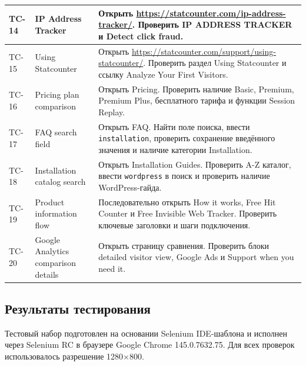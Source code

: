 \documentclass[12pt,a4paper]{report}
\begin{document}
\begin{longtable}{|p{1.5cm}|p{3.9cm}|p{8.8cm}|}
\hline
TC-14 & IP Address Tracker & Открыть \url{https://statcounter.com/ip-address-tracker/}. Проверить IP ADDRESS TRACKER и Detect click fraud. \\
\hline
TC-15 & Using Statcounter & Открыть \url{https://statcounter.com/support/using-statcounter/}. Проверить раздел Using Statcounter и ссылку Analyze Your First Visitors. \\
\hline
TC-16 & Pricing plan comparison & Открыть Pricing. Проверить наличие Basic, Premium, Premium Plus, бесплатного тарифа и функции Session Replay. \\
\hline
TC-17 & FAQ search field & Открыть FAQ. Найти поле поиска, ввести \texttt{installation}, проверить сохранение введённого значения и наличие категории Installation. \\
\hline
TC-18 & Installation catalog search & Открыть Installation Guides. Проверить A-Z каталог, ввести \texttt{wordpress} в поиск и проверить наличие WordPress-гайда. \\
\hline
TC-19 & Product information flow & Последовательно открыть How it works, Free Hit Counter и Free Invisible Web Tracker. Проверить ключевые заголовки и шаги подключения. \\
\hline
TC-20 & Google Analytics comparison details & Открыть страницу сравнения. Проверить блоки detailed visitor view, Google Ads и Support when you need it. \\
\hline
\end{longtable}

\subsection*{Результаты тестирования}
Тестовый набор подготовлен на основании Selenium IDE-шаблона и исполнен через Selenium RC
в браузере Google Chrome 145.0.7632.75. Для всех проверок использовалось разрешение
1280$\times$800.
\end{document}

